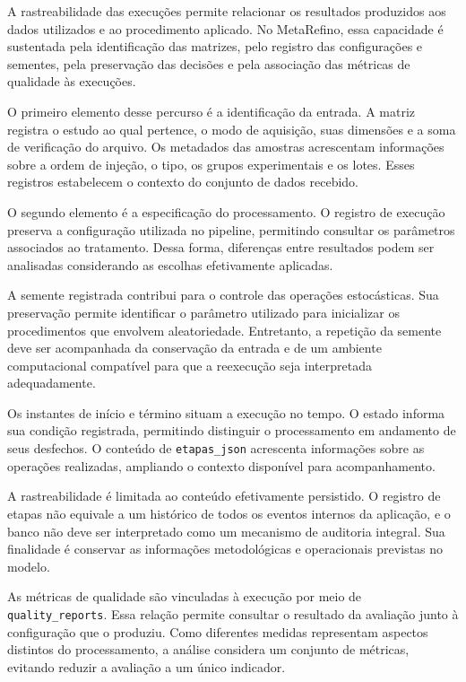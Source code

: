 A rastreabilidade das execuções permite relacionar os resultados produzidos aos dados utilizados e ao procedimento aplicado. No MetaRefino, essa capacidade é sustentada pela identificação das matrizes, pelo registro das configurações e sementes, pela preservação das decisões e pela associação das métricas de qualidade às execuções.

O primeiro elemento desse percurso é a identificação da entrada. A matriz registra o estudo ao qual pertence, o modo de aquisição, suas dimensões e a soma de verificação do arquivo. Os metadados das amostras acrescentam informações sobre a ordem de injeção, o tipo, os grupos experimentais e os lotes. Esses registros estabelecem o contexto do conjunto de dados recebido.

O segundo elemento é a especificação do processamento. O registro de execução preserva a configuração utilizada no pipeline, permitindo consultar os parâmetros associados ao tratamento. Dessa forma, diferenças entre resultados podem ser analisadas considerando as escolhas efetivamente aplicadas.

A semente registrada contribui para o controle das operações estocásticas. Sua preservação permite identificar o parâmetro utilizado para inicializar os procedimentos que envolvem aleatoriedade. Entretanto, a repetição da semente deve ser acompanhada da conservação da entrada e de um ambiente computacional compatível para que a reexecução seja interpretada adequadamente.

Os instantes de início e término situam a execução no tempo. O estado informa sua condição registrada, permitindo distinguir o processamento em andamento de seus desfechos. O conteúdo de \texttt{etapas\_\allowbreak{}json} acrescenta informações sobre as operações realizadas, ampliando o contexto disponível para acompanhamento.

A rastreabilidade é limitada ao conteúdo efetivamente persistido. O registro de etapas não equivale a um histórico de todos os eventos internos da aplicação, e o banco não deve ser interpretado como um mecanismo de auditoria integral. Sua finalidade é conservar as informações metodológicas e operacionais previstas no modelo.

As métricas de qualidade são vinculadas à execução por meio de \texttt{quality\_\allowbreak{}reports}. Essa relação permite consultar o resultado da avaliação junto à configuração que o produziu. Como diferentes medidas representam aspectos distintos do processamento, a análise considera um conjunto de métricas, evitando reduzir a avaliação a um único indicador.

